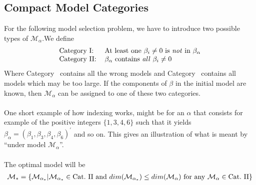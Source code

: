 \documentclass[Research_Module_ES.tex]{subfiles}
\begin{document}
\subsection{Compact Model Categories} \label{chapter_compact_model}
For the following model selection problem, we have to introduce two possible types of $\mathcal{M}_\alpha$.We define
\begin{align*}
\begin{tabular}{ll}
Category~\RM{1}:& At least one $\beta_i\neq 0$ is \textit{not} in $\beta_\alpha$\\
Category~\RM{2}:& $\beta_\alpha$ contains \textit{all} $\beta_i\neq 0$
\end{tabular}
\end{align*}
Where Category~ contains all the wrong models and Category~ contains all models which may be too large. If the components of $\beta$ in the initial model are known, then $\mathcal{M}_\alpha$ can be assigned to one of these two categories.\\\\
One short example of how indexing works, might be for an $\alpha$ that consists for example of the positive integers $\{1,3,4,6\}$ such that it yields $\beta_\alpha=(\beta_1,\beta_3,\beta_4,\beta_6)^\prime$ and so on. This gives an illustration of what is meant by ``under model $\mathcal{M}_\alpha$''.\\\\
The optimal model will be
\begin{align*}
\mathcal{M}_\ast=\{\mathcal{M}_{\alpha_\ast}|\mathcal{M}_{\alpha_\ast}\in \text{Cat.~\RM{2}~and~} dim(\mathcal{M}_{\alpha_\ast})\leq dim(\mathcal{M}_{\alpha})\text{~for~any~}\mathcal{M}_{\alpha}\in \text{Cat.~\RM{2}} \}
\end{align*}
\end{document}
